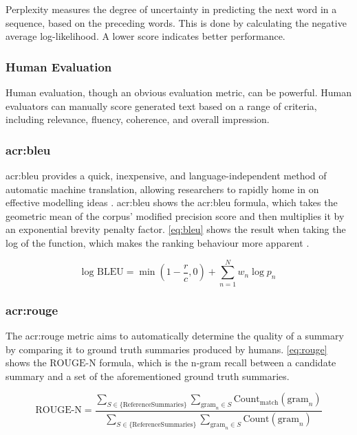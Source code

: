 Perplexity measures the degree of uncertainty in predicting the next word in a sequence, based on the preceding words. This is done by calculating the negative average log-likelihood. A lower score indicates better performance.

\subsubsection{Human Evaluation}

Human evaluation, though an obvious evaluation metric, can be powerful. Human evaluators can manually score generated text based on a range of criteria, including relevance, fluency, coherence, and overall impression.

\subsubsection[BiLingual Evaluation Understudy]{\acrfull{acr:bleu}}

\gls{acr:bleu} provides a quick, inexpensive, and language-independent method of automatic machine translation, allowing researchers to rapidly home in on effective modelling ideas \citep{papineniBleuMethodAutomatic2002}. \gls{acr:bleu} shows the \gls{acr:bleu} formula, which takes the geometric mean of the corpus' modified precision score and then multiplies it by an exponential brevity penalty factor. \eqref{eq:bleu} shows the result when taking the log of the function, which makes the ranking behaviour more apparent \citep[5]{papineniBleuMethodAutomatic2002}.

\begin{equation}
    \text{log BLEU} = \min\left(1 - \frac{r}{c}, 0\right) + \sum_{n=1}^{N} w_n \log p_n
    \label{eq:bleu}
\end{equation}

\subsubsection[Recall-Oriented Understudy (ROUGE)]{\acrfull{acr:rouge}}

The \gls{acr:rouge} metric aims to automatically determine the quality of a summary by comparing it to ground truth summaries produced by humans. \eqref{eq:rouge} shows the $\text{ROUGE-N}$ formula, which is the n-gram recall between a candidate summary and a set of the aforementioned ground truth summaries.

\begin{equation}
    \text{ROUGE-N} = \frac{
    \sum_{S \in \{\text{ReferenceSummaries}\}}
    \sum_{\text{gram}_n \in S}
    \text{Count}_{\text{match}}(\text{gram}_n)
    }{
    \sum_{S \in \{\text{ReferenceSummaries}\}}
    \sum_{\text{gram}_n \in S}
    \text{Count}(\text{gram}_n)
    }
    \label{eq:rouge}
\end{equation}

